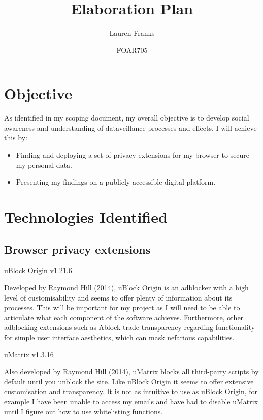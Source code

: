 \documentclass{article}
\title{Elaboration Plan}
\author{Lauren Franks}
\date{FOAR705}
\begin{document}
\maketitle

\section{Objective}

As identified in my scoping document, my overall objective is to develop social awareness and understanding of dataveillance processes and effects. I will achieve this by:
\begin{itemize}
\item Finding and deploying a set of privacy extensions for my browser to secure my personal data.
\item Presenting my findings on a publicly accessible digital platform.
\end{itemize}

\section{Technologies Identified}
\subsection{Browser privacy extensions}

 
\href{https://github.com/gorhill/uBlock}{uBlock Origin v1.21.6}

Developed by Raymond Hill (2014), uBlock Origin is an adblocker with a high level of customisability and seems to offer plenty of information about its processes. This will be important for my project as I will need to be able to articulate what each component of the software achieves. Furthermore, other adblocking extensions such as \href{https://getadblock.com/}{Ablock} trade transparency regarding functionality for simple user interface aesthetics, which can mask nefarious capabilities.\newline


\noindent\href{https://github.com/gorhill/uMatrix}{uMatrix v1.3.16}

Also developed by Raymond Hill (2014), uMatrix blocks all third-party scripts by default until you unblock the site. Like uBlock Origin it seems to offer extensive customisation and transparency. It is not as intuitive to use as uBlock Origin, for example I have been unable to access my emails and have had to disable uMatrix until I figure out how to use whitelisting functions.\newline
\end{document}
